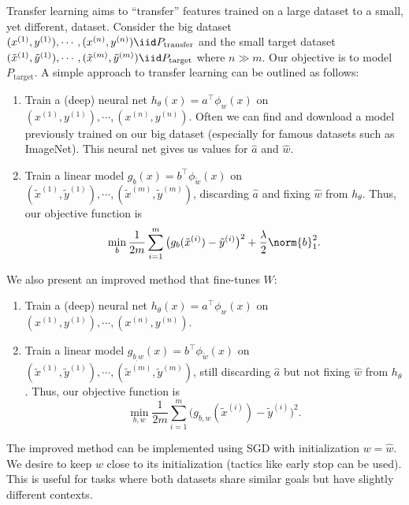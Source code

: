 Transfer learning aims to ``transfer'' features trained on a large dataset to a small, yet different, dataset. Consider the big dataset $(x^{(1)}, y^{(1)}), \cdots, (x^{(n)}, y^{(n)}) \iid P_{\text{transfer}}$ and the small target dataset $(\tilde x^{(1)}, \tilde y^{(1)}), \cdots, (\tilde x^{(m)}, \tilde y^{(m)}) \iid P_{\text{target}}$ where $n \gg m$. Our objective is to model $P_{\text{target}}$. A simple approach to transfer learning can be outlined as follows:
\begin{enumerate}
\item Train a (deep) neural net $h_\theta(x)=a^\top \phi_w(x)$ on $(x^{(1)}, y^{(1)}), \cdots, (x^{(n)}, y^{(n)})$. Often we can find and download a model previously trained on our big dataset (especially for famous datasets such as ImageNet). This neural net gives us values for $\hat{a}$ and $\hat{w}$.
\item Train a linear model $g_b(x) = b^\top \phi_{\widetilde w}(x)$ on $(\tilde x^{(1)}, \tilde y^{(1)}), \cdots, (\tilde x^{(m)}, \tilde y^{(m)})$, discarding $\hat{a}$ and fixing $\hat{w}$ from $h_\theta$. Thus, our objective function is
\[
\min_b \frac{1}{2m} \sum_{i=1}^m \big(g_b(\tilde x^{(i)}) - \tilde y^{(i)}\big)^2 + \frac{\lambda}{2} \norm{b}_1^2.
\]
\end{enumerate}
We also present an improved method that fine-tunes $W$:
\begin{enumerate}
\item Train a (deep) neural net $h_\theta(x)=a^\top \phi_w(x)$ on $(x^{(1)}, y^{(1)}), \cdots, (x^{(n)}, y^{(n)})$.

\item Train a linear model $g_{b_, w}(x) = b^\top \phi_{\widetilde w}(x)$ on $(\tilde x^{(1)}, \tilde y^{(1)}), \cdots, (\tilde x^{(m)}, \tilde y^{(m)})$, still discarding $\hat{a}$ but not fixing $\hat{w}$ from $h_\theta$. Thus, our objective function is
\[
\min_{b, w} \frac{1}{2m} \sum_{i=1}^m \big(g_{b, w}(\tilde x^{(i)}) - \tilde y^{(i)}\big)^2.
\]
\end{enumerate}
The improved method can be implemented using SGD with initialization $w=\hat{w}$. We desire to keep $w$ close to its initialization (tactics like early stop can be used). This is useful for tasks where both datasets share similar goals but have slightly different contexts.